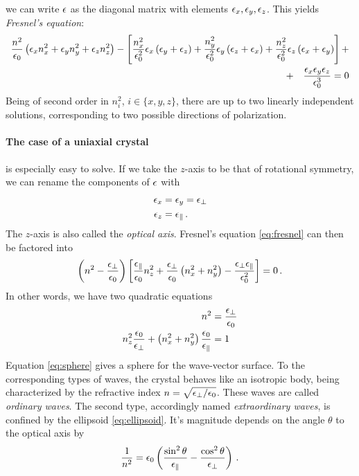 we can write $\mathbf{\epsilon}$ as the diagonal matrix with elements $\epsilon_x, \epsilon_y, \epsilon_z$. 
This yields \emph{Fresnel's equation}:
\begin{align}
    \frac{n^2}{\epsilon_0} \left(\epsilon_x n_x^2 + \epsilon_y n_y^2 + \epsilon_z n_z^2 \right) 
    - \left[
        \frac{n_x^2}{\epsilon_0^2} \epsilon_x \left(\epsilon_y + \epsilon_z\right) + 
        \frac{n_y^2}{\epsilon_0^2} \epsilon_y \left(\epsilon_z + \epsilon_x\right) + 
        \frac{n_z^2}{\epsilon_0^2} \epsilon_z \left(\epsilon_x + \epsilon_y\right) 
    \right] + \nonumber \\
    + \quad \frac{\epsilon_x \epsilon_y \epsilon_z}{\epsilon_0^3} = 0
    \label{eq:fresnel}
\end{align}
Being of second order in $n_i^2$, $i \in \{x, y, z\}$, there are up to two linearly 
independent solutions, corresponding to two possible directions of polarization. 


\paragraph{The case of a uniaxial crystal} 
is especially easy to solve. 
If we take the $z$-axis to be that of rotational symmetry, 
we can rename the components of 
$\mathbf{\epsilon}$ with 
\begin{align}
\epsilon_x &= \epsilon_y = \epsilon_\perp 
\label{eq:eps_perp}\\
\epsilon_z &= \epsilon_\parallel \, .
\label{eq:eps_parallel}
\end{align}
The $z$-axis is also called the \emph{optical axis}.
Fresnel's equation \eqref{eq:fresnel} can then be factored into
\begin{equation}
    \left(n^2 - \frac{\epsilon_\perp}{\epsilon_0}\right) 
    \left[\frac{\epsilon_\parallel}{\epsilon_0} n_z^2 + 
        \frac{\epsilon_\perp}{\epsilon_0} \left(n_x^2 + n_y^2\right) -
        \frac{\epsilon_\perp \epsilon_\parallel}{\epsilon_0^2} 
    \right] = 0 \, .
\end{equation}
In other words, we have two quadratic equations
\begin{align}
    n^2 &= \frac{\epsilon_\perp}{\epsilon_0} 
    \label{eq:sphere} \\
    n_z^2 \frac{\epsilon_0}{\epsilon_\perp} + \left(n_x^2 + n_y^2\right) \frac{\epsilon_0}{\epsilon_\parallel} &= 1
    \label{eq:ellipsoid}
\end{align}
Equation \eqref{eq:sphere} gives a sphere for the wave-vector surface. To the 
corresponding types of waves, the crystal behaves like an isotropic body, being 
characterized by the refractive index $n = \sqrt{\epsilon_\perp / \epsilon_0}$. These waves are 
called \emph{ordinary waves}. The second type, accordingly named 
\emph{extraordinary waves}, is confined by the ellipsoid \eqref{eq:ellipsoid}. 
It's magnitude depends on 
the angle $\theta$ to the optical axis by 
\begin{equation}
    \frac{1}{n^2} = \epsilon_0 \left( \frac{\sin^2 \theta}{\epsilon_\parallel} - 
        \frac{\cos^2 \theta}{\epsilon_\perp} \right)\, .
    \label{eq:theta}
\end{equation}

